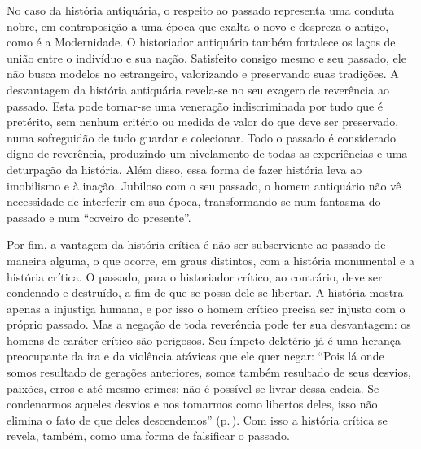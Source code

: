 No caso da história antiquária, o respeito ao passado representa uma
conduta nobre, em contraposição a uma época que exalta o novo e despreza
o antigo, como é a Modernidade. O historiador antiquário também
fortalece os laços de união entre o indivíduo e sua nação. Satisfeito
consigo mesmo e seu passado, ele não busca modelos no estrangeiro,
valorizando e preservando suas tradições. A desvantagem da história
antiquária revela-se no seu exagero de reverência ao passado. Esta pode
tornar-se uma veneração indiscriminada por tudo que é pretérito, sem
nenhum critério ou medida de valor do que deve ser preservado, numa
sofreguidão de tudo guardar e colecionar. Todo o passado é considerado
digno de reverência, produzindo um nivelamento de todas as experiências
e uma deturpação da história. Além disso, essa forma de fazer história
leva ao imobilismo e à inação. Jubiloso com o seu passado, o homem
antiquário não vê necessidade de interferir em sua época,
transformando-se num fantasma do passado e num ``coveiro do presente''.

Por fim, a vantagem da história crítica é não ser subserviente ao
passado de maneira alguma, o que ocorre, em graus distintos, com a
história monumental e a história crítica. O passado, para o historiador
crítico, ao contrário, deve ser condenado e destruído, a fim de que se
possa dele se libertar. A história mostra apenas a injustiça humana, e
por isso o homem crítico precisa ser injusto com o próprio passado. Mas
a negação de toda reverência pode ter sua desvantagem: os homens de
caráter crítico são perigosos. Seu ímpeto deletério já é uma herança
preocupante da ira e da violência atávicas que ele quer negar: ``Pois lá
onde somos resultado de gerações anteriores, somos também resultado de
seus desvios, paixões, erros e até mesmo crimes; não é possível se
livrar dessa cadeia. Se condenarmos aqueles desvios e nos tomarmos como
libertos deles, isso não elimina o fato de que deles descendemos'' (p.\,\pageref{delesdescendemos}).
Com isso a história crítica se revela, também, como uma forma de
falsificar o passado.

